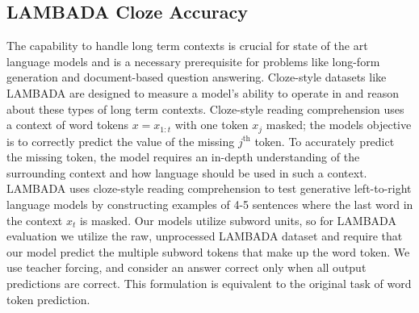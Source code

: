 \documentclass{article}
\begin{document}
\subsection{LAMBADA Cloze Accuracy}
The capability to handle long term contexts is crucial for state of the art language models and is a necessary prerequisite for problems like long-form generation and
document-based question answering. Cloze-style datasets like LAMBADA are designed to measure a model's ability to operate in and reason about these types of long term contexts. Cloze-style reading comprehension uses a context of word tokens $x=x_{1:t}$ with one token $x_j$ masked; the models objective is to correctly predict the value of the missing $j^{\text{th}}$ token. To accurately predict the missing token, the model requires an in-depth understanding of the surrounding context and how language should be used in such a context. LAMBADA uses cloze-style reading comprehension to test generative left-to-right language models by constructing examples of 4-5 sentences where the last word in the context $x_t$ is masked. Our models utilize subword units, so for LAMBADA evaluation we utilize the raw, unprocessed LAMBADA dataset and require that our model predict the multiple subword tokens that make up the word token. We use teacher forcing, and consider an answer correct only when all output predictions are correct. This formulation is equivalent to the original task of word token prediction.
\end{document}
